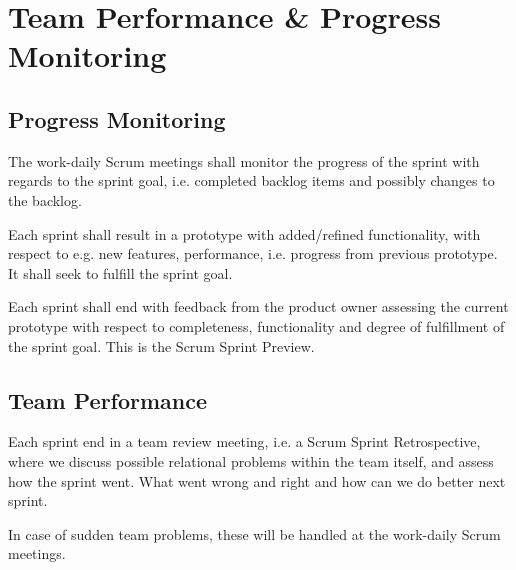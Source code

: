 \section{Team Performance \& Progress Monitoring}

\subsection{Progress Monitoring}
The work-daily Scrum meetings shall monitor the progress of the sprint with regards to the sprint goal, i.e. completed backlog items and possibly changes to the backlog.

Each sprint shall result in a prototype with added/refined functionality, with respect to e.g. new features, performance, i.e. progress from previous prototype. It shall seek to fulfill the sprint goal.

Each sprint shall end with feedback from the product owner assessing the current prototype with respect to completeness, functionality and degree of fulfillment of the sprint goal. This is the Scrum Sprint Preview.

\subsection{Team Performance}
Each sprint end in a team review meeting, i.e. a Scrum Sprint Retrospective, where we discuss possible relational problems within the team itself, and assess how the sprint went. What went wrong and right and how can we do better next sprint.

In case of sudden team problems, these will be handled at the work-daily Scrum meetings.